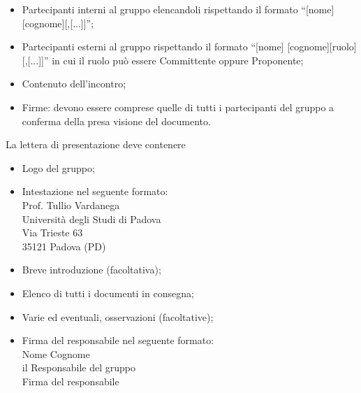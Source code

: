 {{{\begin{itemize}
			\item Partecipanti interni al gruppo elencandoli rispettando il formato “[nome] [cognome][,[...]]”;
			\item Partecipanti esterni al gruppo rispettando il formato “[nome] [cognome][ruolo][,[...]]” in cui il ruolo può essere Committente oppure Proponente;
			\item Contenuto dell'incontro;
			\item Firme: devono essere comprese quelle di tutti i partecipanti del gruppo \gruppo a conferma della presa visione del documento.
		\end{itemize}
	  La lettera di presentazione deve contenere
		\begin{itemize}
			\item Logo del gruppo;
			\item Intestazione nel seguente formato:\\
					Prof. Tullio Vardanega\\
					Università degli Studi di Padova\\
					Via Trieste 63\\
					35121 Padova (PD)
			\item Breve introduzione (facoltativa);
			\item Elenco di tutti i documenti in consegna;
			\item Varie ed eventuali, osservazioni (facoltative);
			\item Firma del responsabile nel seguente formato:\\
					{Nome} {Cognome}\\
					il Responsabile del gruppo \gruppo \\
					{Firma del responsabile}
		\end{itemize}		
	}
}}
